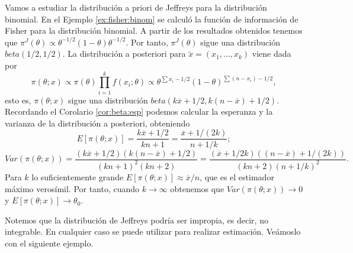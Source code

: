 \begin{ex}
    Vamos a estudiar la distribución a priori de Jeffreys para la distribución binomial. En el Ejemplo \ref{ex:fisher:binom} se calculó la función de información de Fisher para la distribución binomial. A partir de los resultados obtenidos tenemos que $\pi^J(\theta) \propto \theta^{-1/2} (1 - \theta)\theta^{-1/2}$. Por tanto, $\pi^J(\theta)$ sigue una distribución $beta(1/2,1/2)$. La distribución a posteriori para $\utilde{x} = (x_1, \ldots, x_k)$ viene dada por
    \[\pi(\theta; x) \propto \pi(\theta) \prod_{i = 1}^k f(x_i; \theta) \propto \theta^{\sum x_i -1/2} (1 - \theta)^{\sum (n-x_i) -1/2},\]
    esto es, $\pi(\theta;x)$ sigue una distribución $beta(k\overline{x} + 1/2, k(n - \overline{x}) + 1/2)$. Recordando el Corolario \ref{cor:beta:esp} podemos calcular la esperanza y la varianza de la distribución a posteriori, obteniendo
    \[E[\pi(\theta; x)] = \frac{k\overline{x} + 1/2}{kn + 1} = \frac{\overline{x} +1/(2k)}{n + 1/k};\]
    \[Var(\pi(\theta; x)) = \frac{(k\overline{x} + 1/2)(k(n - \overline{x}) + 1/2)}{(kn + 1)^2(kn+2)} = \frac{(\overline{x} +1/{2k})((n - \overline{x}) + 1/(2k))}{(kn+2)(n + 1/k)^2}.\]
    Para $k$ lo suficientemente grande $E[\pi(\theta; x)] \approx \overline{x} / n$, que es el estimador máximo verosímil. Por tanto, cuando $k \to \infty$ obtenemos que $Var(\pi(\theta; x)) \to 0$ y $E[\pi(\theta; x)] \to \theta_0$.
\end{ex}

Notemos que la distribución de Jeffreys podría ser impropia, es decir, no integrable. En cualquier caso se puede utilizar para realizar estimación. Veámoslo con el siguiente ejemplo.

